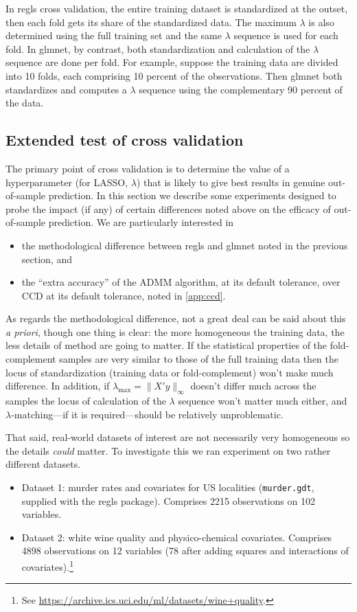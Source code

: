 \documentclass{article}
\begin{document}
In \textsf{regls} cross validation, the entire training dataset is
standardized at the outset, then each fold gets its share of the
standardized data. The maximum $\lambda$ is also determined using the
full training set and the same $\lambda$ sequence is used for each
fold. In \textsf{glmnet}, by contrast, both standardization and
calculation of the $\lambda$ sequence are done per fold. For example,
suppose the training data are divided into 10 folds, each comprising
10 percent of the observations. Then \textsf{glmnet} both standardizes
and computes a $\lambda$ sequence using the complementary 90 percent
of the data.

\subsection*{Extended test of cross validation}

The primary point of cross validation is to determine the value of a
hyperparameter (for LASSO, $\lambda$) that is likely to give best
results in genuine out-of-sample prediction. In this section we
describe some experiments designed to probe the impact (if any) of
certain differences noted above on the efficacy of out-of-sample
prediction. We are particularly interested in
\begin{itemize}
\item the methodological difference between \textsf{regls} and
  \textsf{glmnet} noted in the previous section, and
\item the ``extra accuracy'' of the ADMM algorithm, at its default
  tolerance, over CCD at its default tolerance, noted in
  \ref{app:ccd}.
\end{itemize}

As regards the methodological difference, not a great deal can be said
about this \textit{a priori}, though one thing is clear: the more
homogeneous the training data, the less details of method are going to
matter. If the statistical properties of the fold-complement samples
are very similar to those of the full training data then the locus of
standardization (training data or fold-complement) won't make much
difference. In addition, if $\lambda_{\max} = \|X'y\|_{\infty}$
doesn't differ much across the samples the locus of calculation of the
$\lambda$ sequence won't matter much either, and
$\lambda$-matching---if it is required---should be relatively
unproblematic.

That said, real-world datasets of interest are not necessarily very
homogeneous so the details \textit{could} matter. To investigate this
we ran experiment on two rather different datasets.
\begin{itemize}
\item Dataset 1: murder rates and covariates for US localities
  (\texttt{murder.gdt}, supplied with the \textsf{regls} package).
  Comprises 2215 observations on 102 variables.
\item Dataset 2: white wine quality and physico-chemical covariates.
  Comprises 4898 observations on 12 variables (78 after adding squares
  and interactions of covariates).\footnote{See
    \url{https://archive.ics.uci.edu/ml/datasets/wine+quality}.}
\end{itemize}
\end{document}
